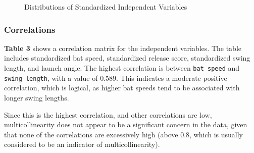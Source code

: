 \documentclass[
  letterpaper,
  DIV=11,
  numbers=noendperiod]{scrartcl}
\begin{document}
\begin{figure}[H]


\caption{\label{fig-dists}Distributions of Standardized Independent
Variables}

\end{figure}%

\newpage

\subsubsection{Correlations}\label{correlations}

\textbf{Table 3} shows a correlation matrix for the independent
variables. The table includes standardized bat speed, standardized
release score, standardized swing length, and launch angle. The highest
correlation is between \texttt{bat\ speed} and \texttt{swing\ length},
with a value of \(0.589\). This indicates a moderate positive
correlation, which is logical, as higher bat speeds tend to be
associated with longer swing lengths.

Since this is the highest correlation, and other correlations are low,
multicollinearity does not appear to be a significant concern in the
data, given that none of the correlations are excessively high (above
0.8, which is usually considered to be an indicator of
multicollinearity).
\end{document}

